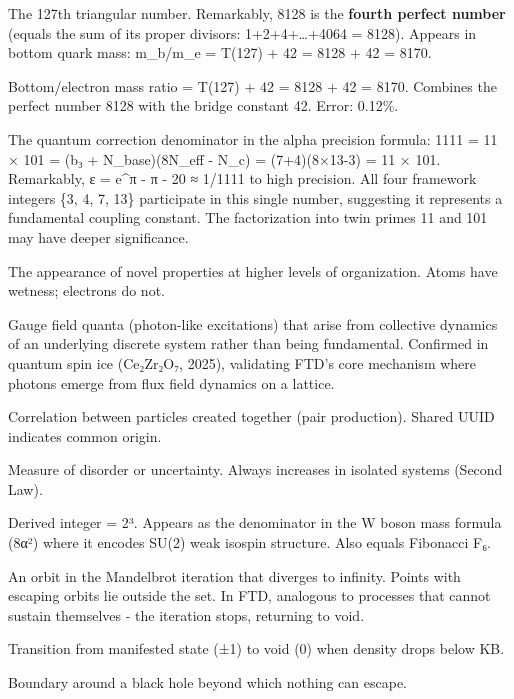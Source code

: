\documentclass[
  11pt,
  letterpaper,
  twoside,
  openany]{book}
\begin{document}
\begin{description}
The 127th triangular number. Remarkably, 8128 is the \textbf{fourth
perfect number} (equals the sum of its proper divisors:
1+2+4+\ldots+4064 = 8128). Appears in bottom quark mass: m\_b/m\_e =
T(127) + 42 = 8128 + 42 = 8170.
\item[\textbf{Eight Thousand One Hundred Seventy (8170)}]
Bottom/electron mass ratio = T(127) + 42 = 8128 + 42 = 8170. Combines
the perfect number 8128 with the bridge constant 42. Error: 0.12\%.
\item[\textbf{Eleven Hundred Eleven (1111)}]
The quantum correction denominator in the alpha precision formula: 1111
= 11 × 101 = (b₃ + N\_base)(8N\_eff - N\_c) = (7+4)(8×13-3) = 11 × 101.
Remarkably, \textbar ε\textbar{} = \textbar e\^{}π - π - 20\textbar{} ≈
1/1111 to high precision. All four framework integers \{3, 4, 7, 13\}
participate in this single number, suggesting it represents a
fundamental coupling constant. The factorization into twin primes 11 and
101 may have deeper significance.
\item[\textbf{Emergence}]
The appearance of novel properties at higher levels of organization.
Atoms have wetness; electrons do not.
\item[\textbf{Emergent Gauge Bosons}]
Gauge field quanta (photon-like excitations) that arise from collective
dynamics of an underlying discrete system rather than being fundamental.
Confirmed in quantum spin ice (Ce₂Zr₂O₇, 2025), validating FTD's core
mechanism where photons emerge from flux field dynamics on a lattice.
\item[\textbf{Entanglement}]
Correlation between particles created together (pair production). Shared
UUID indicates common origin.
\item[\textbf{Entropy}]
Measure of disorder or uncertainty. Always increases in isolated systems
(Second Law).
\item[\textbf{Eight (8 = 2\^{}N\_c)}]
Derived integer = 2³. Appears as the denominator in the W boson mass
formula (8α²) where it encodes SU(2) weak isospin structure. Also equals
Fibonacci F₆.
\item[\textbf{Escaping Orbit (Mandelbrot)}]
An orbit in the Mandelbrot iteration that diverges to infinity. Points
with escaping orbits lie outside the set. In FTD, analogous to processes
that cannot sustain themselves - the iteration stops, returning to void.
\item[\textbf{Evaporation}]
Transition from manifested state (±1) to void (0) when density drops
below KB.
\item[\textbf{Event Horizon}]
Boundary around a black hole beyond which nothing can escape.
\end{description}
\end{document}
